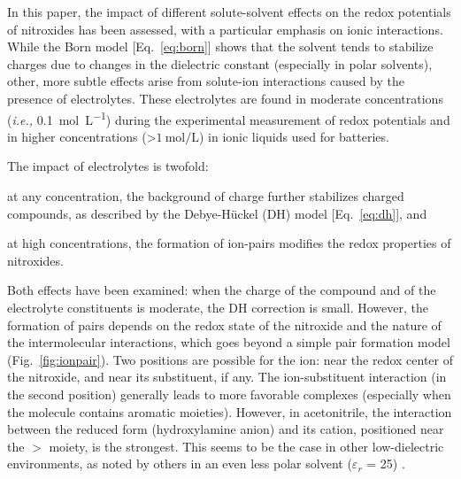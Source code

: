 \documentclass[review,preprint]{elsarticle}
\begin{document}
In this paper, the impact of different solute-solvent effects on the redox potentials of nitroxides has been assessed, with a particular emphasis on ionic interactions. While the Born model [Eq.~\eqref{eq:born}] shows that the solvent tends to stabilize charges due to changes in the dielectric constant (especially in polar solvents), other, more subtle effects arise from solute-ion interactions caused by the presence of electrolytes. These electrolytes are found in moderate concentrations (\textit{i.e.,} \SI{0.1}{\mole\per\liter}) during the experimental measurement of redox potentials and in higher concentrations (>$\SI{1}{\mole\per\liter}$) in ionic liquids used for batteries.

The impact of electrolytes is twofold:
\begin{inparaenum}[(i)]
	\item at any concentration, the background of charge further stabilizes charged compounds, as described by the Debye-Hückel (DH) model [Eq.~\eqref{eq:dh}], and
	\item at high concentrations, the formation of ion-pairs modifies the redox properties of nitroxides.
\end{inparaenum}
Both effects have been examined: when the charge of the compound and of the electrolyte constituents is moderate, the DH correction is small. However, the formation of pairs depends on the redox state of the nitroxide and the nature of the intermolecular interactions, which goes beyond a simple pair formation model (Fig.~\ref{fig:ionpair}). Two positions are possible for the ion: near the redox center of the nitroxide, and near its substituent, if any. The ion-substituent interaction (in the second position) generally leads to more favorable complexes (especially when the molecule contains aromatic moieties). However, in acetonitrile, the interaction between the reduced form (hydroxylamine anion) and its cation, positioned near the $>$ moiety, is the strongest. This seems to be the case in other low-dielectric environments, as noted by others in an even less polar solvent ($\varepsilon_r$ = 25) \cite{wylieImprovedPerformanceAllOrganic2019a}.
\end{document}
